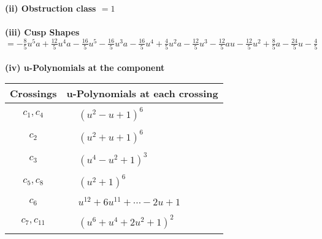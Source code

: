 \documentclass[1p]{elsarticle_modified}
\theoremstyle{definition}
\begin{document}
\flushleft \textbf{(ii) Obstruction class $= 1$}\\~\\
\flushleft \textbf{(iii) Cusp Shapes $= -\frac{8}{5} u^5 a+\frac{12}{5} u^4 a-\frac{16}{5} u^5-\frac{16}{5} u^3 a-\frac{16}{5} u^4+\frac{4}{5} u^2 a-\frac{12}{5} u^3-\frac{12}{5} a u-\frac{12}{5} u^2+\frac{8}{5} a-\frac{24}{5} u-\frac{4}{5}$}\\~\\
\newpage\renewcommand{\arraystretch}{1}
\flushleft \textbf{(iv) u-Polynomials at the component}\newline \\
\begin{tabular}{m{50pt}|m{274pt}}
Crossings & \hspace{64pt}u-Polynomials at each crossing \\
\hline $$\begin{aligned}c_{1},c_{4}\end{aligned}$$&$\begin{aligned}
&(u^2- u+1)^6
\end{aligned}$\\
\hline $$\begin{aligned}c_{2}\end{aligned}$$&$\begin{aligned}
&(u^2+u+1)^6
\end{aligned}$\\
\hline $$\begin{aligned}c_{3}\end{aligned}$$&$\begin{aligned}
&(u^4- u^2+1)^3
\end{aligned}$\\
\hline $$\begin{aligned}c_{5},c_{8}\end{aligned}$$&$\begin{aligned}
&(u^2+1)^6
\end{aligned}$\\
\hline $$\begin{aligned}c_{6}\end{aligned}$$&$\begin{aligned}
&u^{12}+6 u^{11}+\cdots-2 u+1
\end{aligned}$\\
\hline $$\begin{aligned}c_{7},c_{11}\end{aligned}$$&$\begin{aligned}
&(u^6+u^4+2 u^2+1)^2
\end{aligned}$\\

\end{tabular}
\end{document}
